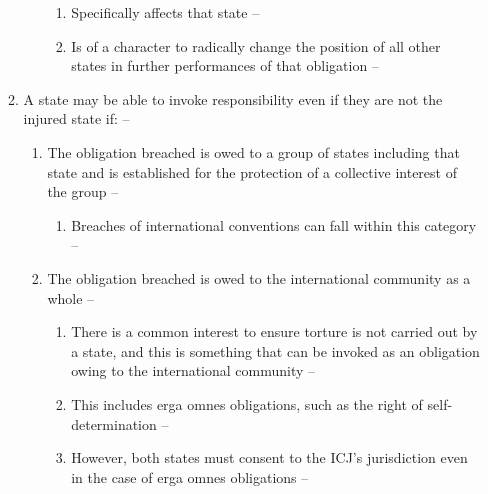 \begin{enumerate}
\begin{enumerate}
\begin{enumerate}
\begin{enumerate}
                \item Specifically affects that state -- 
                \item Is of a character to radically change the position of all other states in further performances of that obligation -- 
            \end{enumerate}
        \end{enumerate}
        \item A state may be able to invoke responsibility even if they are not the injured state if: -- 
        \begin{enumerate}
            \item The obligation breached is owed to a group of states including that state and is established for the protection of a collective interest of the group -- 
            \begin{enumerate}
                \item Breaches of international conventions can fall within this category -- 
            \end{enumerate}
            \item The obligation breached is owed to the international community as a whole -- 
            \begin{enumerate}
                \item There is a common interest to ensure torture is not carried out by a state, and this is something that can be invoked as an obligation owing to the international community -- 
                \item This includes \gls{erga omnes} obligations, such as the right of self-determination -- 
                \item However, both states must consent to the ICJ's jurisdiction even in the case of \gls{erga omnes} obligations -- 

\end{enumerate}
\end{enumerate}
\end{enumerate}
\end{enumerate}
